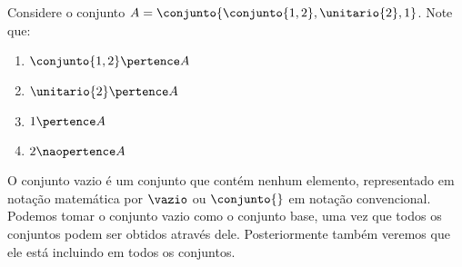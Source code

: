 \begin{example}
    \label{exe:conjuntos-de-conjuntos-explicito}
    Considere o conjunto $A = \conjunto{\conjunto{1, 2},\unitario{2}, 1}$. Note que:
    \begin{enumerate}
        \item $\conjunto{1, 2} \pertence A$
        \item $\unitario{2} \pertence A$
        \item $1 \pertence A$
        \item $2 \naopertence A$
    \end{enumerate}
\end{example}

\begin{definition}
    \label{def:vazio} 
    O conjunto vazio é um conjunto que contém nenhum elemento, representado em notação matemática por $\vazio$ ou $\conjunto{}$ em notação convencional. Podemos tomar o conjunto vazio como o conjunto base, uma vez que todos os conjuntos podem ser obtidos através dele. Posteriormente também veremos que ele está incluindo em todos os conjuntos. 
\end{definition}
